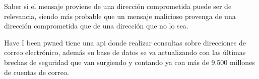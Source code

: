 Saber si el mensaje proviene de una dirección comprometida puede ser de relevancia, siendo más probable que un mensaje malicioso provenga de una dirección comprometida que de una dirección que no lo sea. 

Have I been pwned tiene una api \cite{Have_I_been_pwned_api} donde realizar consultas sobre direcciones de correo electrónico, además su base de datos se va actualizando con las últimas brechas de seguridad que van surgiendo y contando ya con más de 9.500 millones de cuentas de correo.

